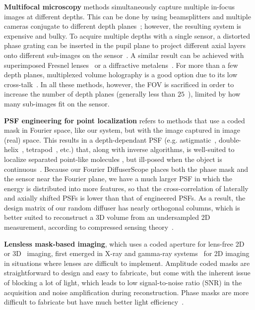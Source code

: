\documentclass{osa-article}
\begin{document}
\textbf{Multifocal microscopy} methods simultaneously capture multiple in-focus images at different depths. This can be done by using beamsplitters and multiple cameras conjugate to different depth planes~\cite{prabhat2004TwoCamera}; however, the resulting system is expensive and bulky. To acquire multiple depths with a single sensor, a distorted phase grating can be inserted in the pupil plane to project different axial layers onto different sub-images on the sensor~\cite{blanchard1999MultifocalGrating,abrahamsson2013multifocus, he2018computational_multifocus}. A similar result can be achieved with superimposed Fresnel lenses~\cite{maurer2010SLMmultifocal} or a diffractive metalens~\cite{guo2019metalens}. For more than a few depth planes, multiplexed volume holography is a good option due to its low cross-talk~\cite{luo2010VolumeHolo}. In all these methods, however, the FOV is sacrificed in order to increase the number of depth planes (generally less than $25$~\cite{he2018computational_multifocus}), limited by how many sub-images fit on the sensor. 

\textbf{PSF engineering for point localization} refers to methods that use a coded mask in Fourier space, like our system, but with the image captured in image (real) space. This results in a depth-dependant PSF (e.g. astigmatic~\cite{kao1994astigmatic,huang2008astigmatic}, double-helix~\cite{greengard2006dhelix1,pavani2009dhelix2,berlich2016dhelix_singleshot}, tetrapod~\cite{shechtman2015tetrapod}, etc.) that, along with inverse algorithms, is well-suited to localize separated point-like molecules \cite{kao1994astigmatic,huang2008astigmatic,greengard2006dhelix1,pavani2009dhelix2,shechtman2015tetrapod}, but ill-posed when the object is continuous~\cite{berlich2016dhelix_singleshot}. Because our Fourier DiffuserScope places both the phase mask and the sensor near the Fourier plane, we have a much larger PSF in which the energy is distributed into more features, so that the cross-correlation of laterally and axially shifted PSFs is lower than that of engineered PSFs. As a result, the design matrix of our random diffuser has nearly orthogonal columns, which is better suited to reconstruct a 3D volume from an undersampled 2D measurement, according to compressed sensing theory~\cite{candes2005rip}.

\textbf{Lensless mask-based imaging}, which uses a coded aperture for lens-free 2D~\cite{asif2015flatcam} or 3D~\cite{adams2017flatscope} imaging, first emerged in X-ray and gamma-ray systems~\cite{dicke1968coded_aper_xray,fenimore1978coded_aper} for 2D imaging in situations where lenses are difficult to implement. Amplitude coded masks are straightforward to design and easy to fabricate, but come with the inherent issue of blocking a lot of light, which leads to low signal-to-noise ratio (SNR) in the acquisition and noise amplification during reconstruction. Phase masks are more difficult to fabricate but have much better light efficiency~\cite{boominathan2020phlatcam}. 
\end{document}
